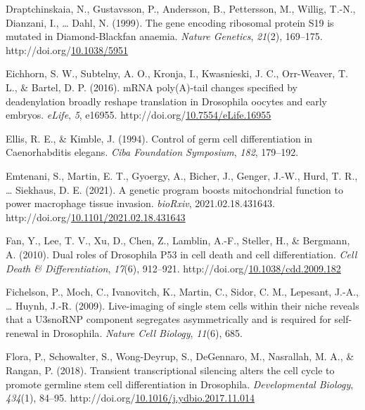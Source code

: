 \documentclass[12pt,oneside]{reedthesis}
\newlength{\cslhangindent}
\newenvironment{CSLReferences}[2] %
 {%
  \setlength{\parindent}{0pt}
  \ifodd #1 \everypar{\setlength{\hangindent}{\cslhangindent}}\ignorespaces\fi
  \ifnum #2 > 0
  \setlength{\parskip}{#2\baselineskip}
  \fi
 }%
 {}
\begin{document}
\begin{CSLReferences}{1}{0}
\leavevmode{}%
Draptchinskaia, N., Gustavsson, P., Andersson, B., Pettersson, M., Willig, T.-N., Dianzani, I., \ldots{} Dahl, N. (1999). The gene encoding ribosomal protein {S19} is mutated in {Diamond}-{Blackfan} anaemia. \emph{Nature Genetics}, \emph{21}(2), 169--175. http://doi.org/\href{https://doi.org/10.1038/5951}{10.1038/5951}

\leavevmode{}%
Eichhorn, S. W., Subtelny, A. O., Kronja, I., Kwasnieski, J. C., Orr-Weaver, T. L., \& Bartel, D. P. (2016). {mRNA} poly({A})-tail changes specified by deadenylation broadly reshape translation in {Drosophila} oocytes and early embryos. \emph{eLife}, \emph{5}, e16955. http://doi.org/\href{https://doi.org/10.7554/eLife.16955}{10.7554/eLife.16955}

\leavevmode{}%
Ellis, R. E., \& Kimble, J. (1994). Control of germ cell differentiation in {Caenorhabditis} elegans. \emph{Ciba Foundation Symposium}, \emph{182}, 179--192.

\leavevmode{}%
Emtenani, S., Martin, E. T., Gyoergy, A., Bicher, J., Genger, J.-W., Hurd, T. R., \ldots{} Siekhaus, D. E. (2021). A genetic program boosts mitochondrial function to power macrophage tissue invasion. \emph{bioRxiv}, 2021.02.18.431643. http://doi.org/\href{https://doi.org/10.1101/2021.02.18.431643}{10.1101/2021.02.18.431643}

\leavevmode{}%
Fan, Y., Lee, T. V., Xu, D., Chen, Z., Lamblin, A.-F., Steller, H., \& Bergmann, A. (2010). Dual roles of {Drosophila} P53 in cell death and cell differentiation. \emph{Cell Death \& Differentiation}, \emph{17}(6), 912--921. http://doi.org/\href{https://doi.org/10.1038/cdd.2009.182}{10.1038/cdd.2009.182}

\leavevmode{}%
Fichelson, P., Moch, C., Ivanovitch, K., Martin, C., Sidor, C. M., Lepesant, J.-A., \ldots{} Huynh, J.-R. (2009). Live-imaging of single stem cells within their niche reveals that a {U3snoRNP} component segregates asymmetrically and is required for self-renewal in {Drosophila}. \emph{Nature Cell Biology}, \emph{11}(6), 685.

\leavevmode{}%
Flora, P., Schowalter, S., Wong-Deyrup, S., DeGennaro, M., Nasrallah, M. A., \& Rangan, P. (2018). Transient transcriptional silencing alters the cell cycle to promote germline stem cell differentiation in {Drosophila}. \emph{Developmental Biology}, \emph{434}(1), 84--95. http://doi.org/\href{https://doi.org/10.1016/j.ydbio.2017.11.014}{10.1016/j.ydbio.2017.11.014}


\end{CSLReferences}
\end{document}
